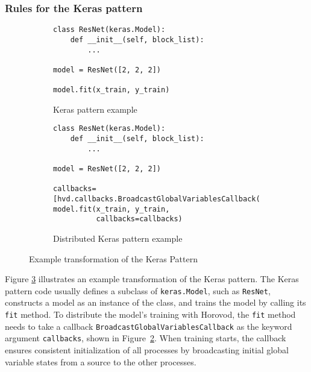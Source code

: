 
   


\subsubsection{Rules for the Keras pattern}

\begin{figure}[ht!]\centering
  \begin{subfigure}[t]{0.8\textwidth}
  \begin{lstlisting}[style=mpython]
class ResNet(keras.Model):
    def __init__(self, block_list):
        ...

model = ResNet([2, 2, 2])

model.fit(x_train, y_train)\end{lstlisting}
  \caption{Keras pattern example}
    \label{fig:trans:keras:a}
  \end{subfigure}
  \hspace{3mm}
  \begin{subfigure}[t]{0.8\textwidth}
  \begin{lstlisting}[style=mpython]
class ResNet(keras.Model):
    def __init__(self, block_list):
        ...

model = ResNet([2, 2, 2])

callbacks=[hvd.callbacks.BroadcastGlobalVariablesCallback(0)]
model.fit(x_train, y_train,
          callbacks=callbacks)\end{lstlisting}
    \caption{Distributed Keras pattern example}
    \label{fig:trans:keras:b}
  \end{subfigure}
  \caption{Example transformation of the Keras Pattern}
  \label{fig:trans:keras}
\end{figure}

\noindent
Figure \ref{fig:trans:keras} illustrates an example transformation of the Keras
pattern.
The Keras pattern code usually defines a subclass of {\tt keras.Model}, such
as {\tt ResNet}, constructs a model as an instance of the class, and trains the
model by calling its {\tt fit} method.
To distribute the model's training with Horovod, the {\tt fit} method needs to
take a callback {\tt BroadcastGlobalVariablesCallback} as the keyword argument
{\tt callbacks}, shown in Figure~\ref{fig:trans:keras:b}.
When training starts, the callback ensures consistent initialization of all
processes by broadcasting initial global variable states from a source to the
other processes.

